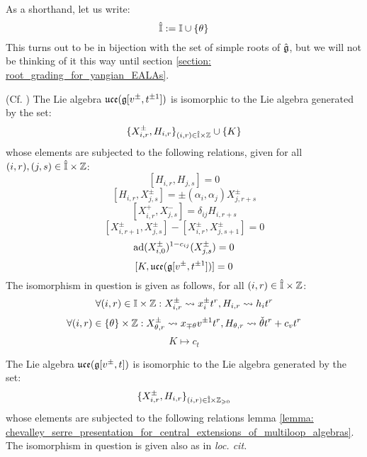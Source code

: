         \begin{convention}
            As a shorthand, let us write:
                $$\hat{\mathbb{I}} := \mathbb{I} \cup \{\theta\}$$
            This turns out to be in bijection with the set of simple roots of $\hat{\mathfrak{g}}$, but we will not be thinking of it this way until section \ref{section: root_grading_for_yangian_EALAs}.
        \end{convention}
        \begin{lemma} \label{lemma: chevalley_serre_presentation_for_central_extensions_of_multiloop_algebras}
            (Cf. \cite[Proposition 3.5]{moody_rao_yokonuma_vertex_representations_of_toroidal_lie_algebras}) The Lie algebra $\mathfrak{uce}(\mathfrak{g}[v^{\pm}, t^{\pm 1}])$ is isomorphic to the Lie algebra generated by the set:
                $$\{ X_{i, r}^{\pm}, H_{i, r} \}_{(i, r) \in \hat{\simpleroots} \x \Z} \cup \{ K \}$$
            whose elements are subjected to the following relations, given for all $(i, r), (j, s) \in \hat{\simpleroots} \x \Z$:
                $$[ H_{i, r}, H_{j, s} ] = 0$$
                $$[ H_{i, r}, X_{j, s}^{\pm} ] = \pm (\alpha_i, \alpha_j) X_{j, r + s}^{\pm}$$
                $$[ X_{i, r}^+, X_{j, s}^- ] = \delta_{ij} H_{i, r + s}$$
                $$[ X_{i, r + 1}^{\pm}, X_{j, s}^{\pm} ] - [ X_{i, r}^{\pm}, X_{j, s + 1}^{\pm} ] = 0$$
                $$\mathrm{ad}(X_{i, 0}^{\pm})^{1 - c_{ij}}( X_{j, s}^{\pm} ) = 0$$
                $$[K, \mathfrak{uce}(\mathfrak{g}[v^{\pm}, t^{\pm 1}])] = 0$$
            The isomorphism in question is given as follows, for all $(i, r) \in \hat{\simpleroots} \x \Z$:
                $$\forall (i, r) \in \simpleroots \x \Z: X_{i, r}^{\pm} \mapsto x_i^{\pm} t^r, H_{i, r} \mapsto h_i t^r$$
                $$\forall (i, r) \in \{\theta\} \x \Z: X_{\theta, r}^{\pm} \mapsto x_{\mp \theta} v^{\pm 1} t^r, H_{\theta, r} \mapsto \check{\theta} t^r + c_v t^r$$
                $$K \mapsto c_t$$
        \end{lemma}
        \begin{corollary}
            The Lie algebra $\mathfrak{uce}(\mathfrak{g}[v^{\pm}, t])$ is isomorphic to the Lie algebra generated by the set:
                $$\{ X_{i, r}^{\pm}, H_{i, r} \}_{(i, r) \in \hat{\simpleroots} \x \Z_{\geq 0}}$$
            whose elements are subjected to the following relations lemma \ref{lemma: chevalley_serre_presentation_for_central_extensions_of_multiloop_algebras}. The isomorphism in question is given also as in \textit{loc. cit.}
        \end{corollary}
